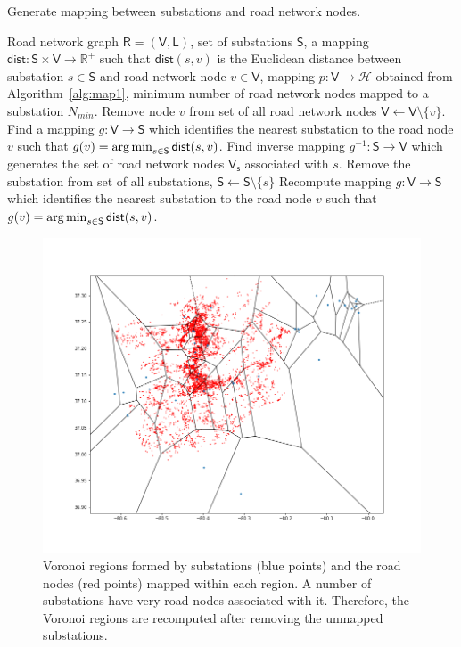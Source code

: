 \begin{algorithm}[H]
	\caption{Generate mapping between substations and road network nodes.}
	\label{alg:map2}
	\begin{algorithmic}[1]
		\Require Road network graph $\mathsf{R=(\mathsf{V},\mathsf{L})}$, set of substations $\mathsf{S}$, a mapping $\mathsf{dist}:\mathsf{S}\times\mathsf{V}\rightarrow\mathbb{R}^{+}$ such that $\mathsf{dist}(s,v)$ is the Euclidean distance between substation $s\in\mathsf{S}$ and road network node $v\in\mathsf{V}$, mapping $p:\mathsf{V}\rightarrow\mathcal{H}$ obtained from Algorithm~\ref{alg:map1}, minimum number of road network nodes mapped to a substation $N_{min}$.
		\State Remove node $v$ from set of all road network nodes $\mathsf{V}\leftarrow\mathsf{V}\setminus\{v\}$.
		\Else 
		\State Find a mapping $g:\mathsf{V}\rightarrow\mathsf{S}$ which identifies the nearest substation to the road node $v$ such that $g(v)=\operatorname*{arg\,min}_{s\in\mathsf{S}}\mathsf{dist}(s,v)$.
		\EndIf
		\EndFor
		\State Find inverse mapping $g^{-1}:\mathsf{S}\rightarrow\mathsf{V}$ which generates the set of road network nodes $\mathsf{V_s}$ associated with $s$.
		\State Remove the substation from set of all substations, $\mathsf{S}\leftarrow\mathsf{S}\setminus\{s\}$
		\EndIf 
		\EndFor
		\State Recompute mapping $g:\mathsf{V}\rightarrow\mathsf{S}$ which identifies the nearest substation to the road node $v$ such that $g(v)=\operatorname*{arg\,min}_{s\in\mathsf{S}}\mathsf{dist}(s,v)$.
	\end{algorithmic}
\end{algorithm}

\begin{figure}[H]
	\centering
	\includegraphics[scale=0.42]{map1}
	\caption{Voronoi regions formed by substations (blue points) and the road nodes (red points) mapped within each region. A number of substations have very road nodes associated with it. Therefore, the Voronoi regions are recomputed after removing the unmapped substations.}
\end{figure}

